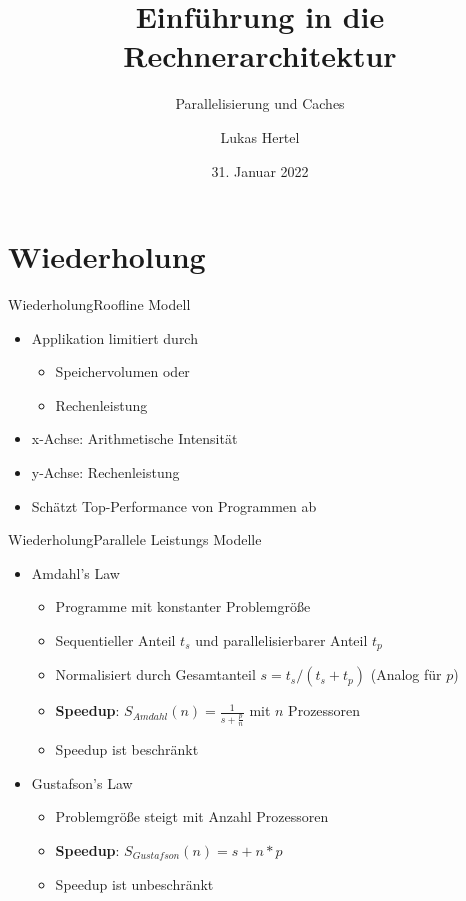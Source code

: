 \documentclass[
  german,            %
  aspectratio=169,    %
  sectionpage=false,   %
]{tumbeamer}
\title{Einführung in die Rechnerarchitektur}
\subtitle{Parallelisierung und Caches}
\author{Lukas Hertel}
\institute{\theChairName\\\theDepartmentName\\\theUniversityName}
\date[31.01.2022]{31. Januar 2022}
\begin{document}
\maketitle

\section{Wiederholung}
\begin{frame}{Wiederholung}{Roofline Modell}
  \begin{itemize}
    \item Applikation limitiert durch
    \begin{itemize}
      \item Speichervolumen oder
      \item Rechenleistung
    \end{itemize}
    \item x-Achse: Arithmetische Intensität
    \item y-Achse: Rechenleistung
    \item Schätzt Top-Performance von Programmen ab
  \end{itemize}
\end{frame}
\begin{frame}{Wiederholung}{Parallele Leistungs Modelle}
\begin{itemize}
  \item Amdahl's Law
  \begin{itemize}
    \item Programme mit konstanter Problemgröße
    \item Sequentieller Anteil $t_s$ und parallelisierbarer Anteil $t_p$
    \item Normalisiert durch Gesamtanteil $s = t_s / (t_s + t_p)$ (Analog für $p$)
    \item \textbf{Speedup}: $S_{Amdahl}(n) = \frac{1}{s+\frac{p}{n}}$ mit $n$ Prozessoren
    \item Speedup ist beschränkt
  \end{itemize}
  \item Gustafson's Law 
  \begin{itemize}
    \item Problemgröße steigt mit Anzahl Prozessoren 
    \item \textbf{Speedup}: $S_{Gustafson}(n)=s+n*p$
    \item Speedup ist unbeschränkt
  \end{itemize}
\end{itemize}
\end{frame}
\end{document}

